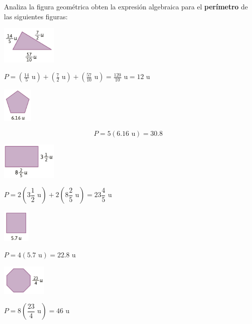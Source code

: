 Analiza la figura geométrica obten la expresión algebraica para el \textbf{perímetro} de las siguientes figuras:

\begin{multicols}{2}
    \begin{parts}
        {\printanswers
            \centering \includegraphics[width=0.2\textwidth]{../images/20230319021512}
            \begin{solutionbox}{2cm} $P=\left(\frac{14}{5} \text{ u}\right)+\left(\frac{7}{2}\text{ u}\right)+\left(\frac{57}{10}\text{ u}\right)=\frac{120}{10}\text{ u}=12 \text{ u} $\end{solutionbox}
        }
        \centering \includegraphics[width=0.11\textwidth]{../images/20230319021457}
        \begin{solutionbox}{1.5cm}\[P=5 \left( 6.16 \text{ u}\right)=30.8\]\end{solutionbox}


        \centering \includegraphics[width=0.2\textwidth]{../images/20230319021443}
        \begin{solutionbox}{2cm}$P=2 \left( 3\dfrac{1}{2} \text{ u}\right)+2 \left( 8\dfrac{2}{5} \text{ u}\right)=23\dfrac{4}{5} \text{ u}$\end{solutionbox}

        \centering \includegraphics[width=0.1\textwidth]{../images/20230319021432}
        \begin{solutionbox}{1.5cm}$P=4 \left( 5.7 \text{ u}\right)=22.8 \text{ u}$\end{solutionbox}

        \centering \includegraphics[width=0.16\textwidth]{../images/20230319021504}
        \begin{solutionbox}{2cm}$P=8 \left( \dfrac{23}{4} \text{ u}\right)=46\text{ u}$\end{solutionbox}


\end{parts}
\end{multicols}
